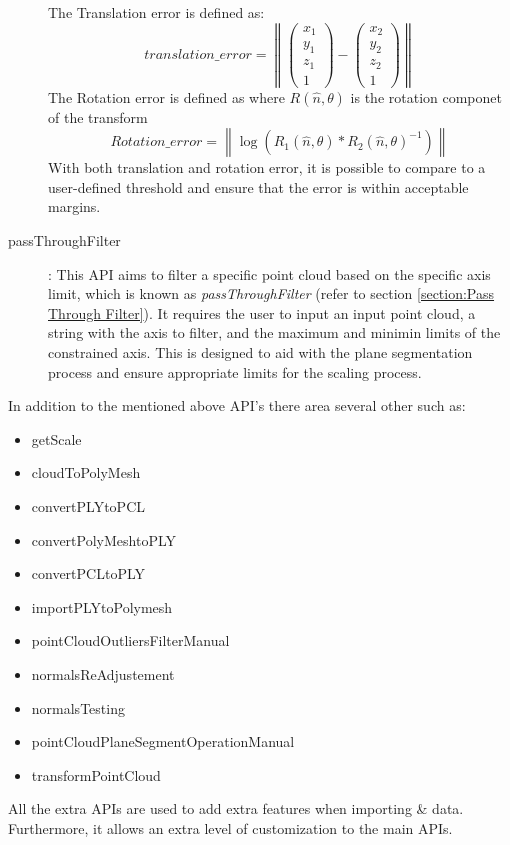 \documentclass[12pt]{report}
\begin{document}
\begin{description}
   The Translation error is defined as:
   \begin{equation}
     translation\_error = \left\lVert \begin{pmatrix} x_1 \\y_1\\z_1\\1  \end{pmatrix} - \begin{pmatrix} x_2 \\y_2\\z_2\\1  \end{pmatrix} \right\rVert    
    \label{equ:translation error}
    \end{equation}
   The Rotation error is defined as where $R(\hat{n},\theta)$ is the rotation componet of the transform 
   \begin{equation}
     Rotation\_error =\left\lVert \log (R_1(\hat{n},\theta) * R_2(\hat{n},\theta)^{-1} ) \right\rVert 
   \end{equation}
 With both translation and rotation error, it is possible to compare to a user-defined threshold and ensure that the error is within acceptable margins. 
  \item[passThroughFilter]: This API aims to filter a specific point cloud based on the specific axis limit, which is known as \textit{passThroughFilter} (refer to section \ref{section:Pass Through Filter}).
  It requires the user to input an input point cloud, a string with the axis to filter, and the maximum and minimin limits of the constrained axis. This is designed to aid with the plane segmentation process and ensure appropriate limits for the scaling process.  
\end{description}

In addition to the mentioned above API's there area several other such as:
\begin{multicols}{2}
\begin{itemize}
  \itemsep0em 
  \item getScale
  \item cloudToPolyMesh
  \item convertPLYtoPCL
  \item convertPolyMeshtoPLY
  \item convertPCLtoPLY
  \item importPLYtoPolymesh
  \item pointCloudOutliersFilterManual
  \item normalsReAdjustement
  \item normalsTesting 
  \item pointCloudPlaneSegmentOperationManual
  \item transformPointCloud
\end{itemize}
\end{multicols}
All the extra APIs are used to add extra features when importing \& data. Furthermore, it allows an extra level of customization to the main APIs.  
\end{document}
